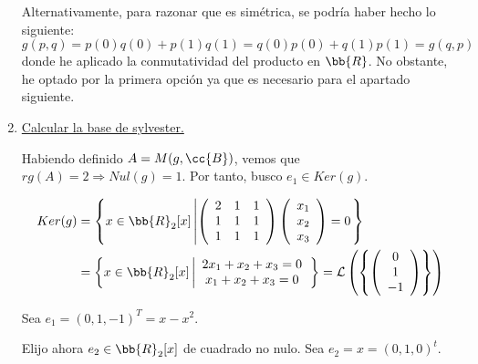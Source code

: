 \begin{ejercicio}
\begin{enumerate}
        Alternativamente, para razonar que es simétrica, se podría haber hecho lo siguiente:
        \begin{equation*}
            g(p,q) = p(0)q(0) + p(1)q(1) = q(0)p(0) + q(1)p(1) = g(q,p)
        \end{equation*}
        donde he aplicado la conmutatividad del producto en $\bb{R}$. No obstante, he optado por la primera opción ya que es necesario para el apartado siguiente.

        \item \underline{Calcular la base de sylvester.}
        
        Habiendo definido $A=M(g,\cc{B})$, vemos que $rg(A)=2 \Longrightarrow Nul(g)=1$. Por tanto, busco $e_1\in Ker(g)$.
        
        \begin{equation*}\begin{split}
            Ker(g) & = \left\{x\in \bb{R}_2[x] \left|
            \left( \begin{array}{ccc}
                2 & 1 & 1 \\
                1 & 1 & 1 \\
                1 & 1 & 1 \\
            \end{array}\right)
            \left( \begin{array}{c}
                x_1 \\ x_2 \\ x_3
            \end{array}\right)
            = 0
            \right.\right\}\\
            &= \left\{x\in \bb{R}_2[x] \left|
            \begin{array}{c}
                2x_1 + x_2 + x_3 = 0 \\
                x_1 + x_2 + x_3 = 0
            \end{array}
            \right.\right\} = \mathcal{L} \left( \left\{ \left(
            \begin{array}{c}
                0 \\ 1 \\ -1
            \end{array}
            \right) \right\}\right)
        \end{split}\end{equation*}

        Sea $e_1 = (0,1,-1)^T = x-x^2$.
        
        Elijo ahora $e_2\in \bb{R}_2[x]$ de cuadrado no nulo. Sea $e_2 = x = (0,1,0)^t$.


\end{enumerate}
\end{ejercicio}
